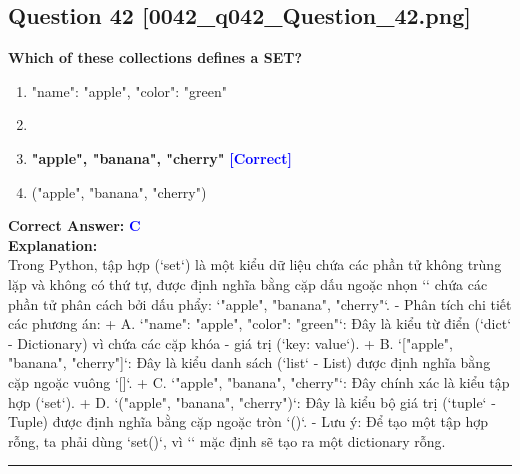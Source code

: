 \documentclass[11pt,a4paper]{article}
\begin{document}
\begin{minipage}{\textwidth}
\subsection*{Question 42 \quad \footnotesize{[0042_q042_Question_42.png]}}
\noindent \textbf{Which of these collections defines a SET?}

\begin{enumerate}[label=\Alph*.]
    \item "name": "apple", "color": "green"
    \item ["apple", "banana", "cherry"]
    \item \textbf{"apple", "banana", "cherry"} \hfill \textcolor{blue}{\textbf{[Correct]}}
    \item ("apple", "banana", "cherry")
\end{enumerate}

\noindent \textbf{Correct Answer:} \textcolor{blue}{\textbf{C}} \\[4pt]
\noindent \textbf{Explanation:}\\
Trong Python, tập hợp (`set`) là một kiểu dữ liệu chứa các phần tử không trùng lặp và không có thứ tự, được định nghĩa bằng cặp dấu ngoặc nhọn `{}` chứa các phần tử phân cách bởi dấu phẩy: `{"apple", "banana", "cherry"}`.\newline
- Phân tích chi tiết các phương án:\newline
  + A. `{"name": "apple", "color": "green"}`: Đây là kiểu từ điển (`dict` - Dictionary) vì chứa các cặp khóa - giá trị (`key: value`).\newline
  + B. `["apple", "banana", "cherry"]`: Đây là kiểu danh sách (`list` - List) được định nghĩa bằng cặp ngoặc vuông `[]`.\newline
  + C. `{"apple", "banana", "cherry"}`: Đây chính xác là kiểu tập hợp (`set`).\newline
  + D. `("apple", "banana", "cherry")`: Đây là kiểu bộ giá trị (`tuple` - Tuple) được định nghĩa bằng cặp ngoặc tròn `()`.\newline
- Lưu ý: Để tạo một tập hợp rỗng, ta phải dùng `set()`, vì `{}` mặc định sẽ tạo ra một dictionary rỗng.
\end{minipage}
\vspace{0.8cm}
\hrule
\vspace{0.5cm}
\end{document}
